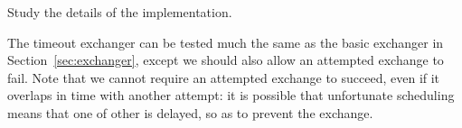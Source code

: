 \begin{instruction}
Study the details of the implementation.
\end{instruction}

The timeout exchanger can be tested much the same as the basic exchanger in
Section~\ref{sec:exchanger}, except we should also allow an attempted exchange
to fail.  Note that we cannot require an attempted exchange to succeed, even
if it overlaps in time with another attempt: it is possible that unfortunate
scheduling means that one of other is delayed, so as to prevent the exchange.
